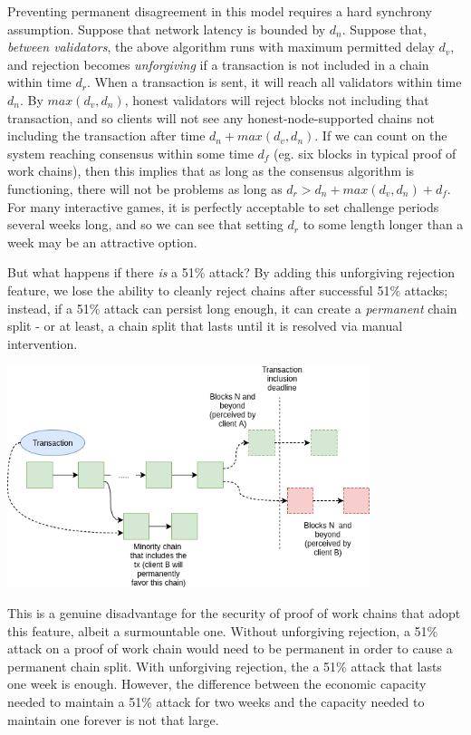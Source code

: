 \documentclass[12pt]{article}
\begin{document}
Preventing permanent disagreement in this model requires a hard synchrony assumption. Suppose that network latency is bounded by $d_n$. Suppose that, \textit{between validators}, the above algorithm runs with maximum permitted delay $d_v$, and rejection becomes \textit{unforgiving} if a transaction is not included in a chain within time $d_r$. When a transaction is sent, it will reach all validators within time $d_n$. By $max(d_v, d_n)$, honest validators will reject blocks not including that transaction, and so clients will not see any honest-node-supported chains not including the transaction after time $d_n + max(d_v, d_n)$. If we can count on the system reaching consensus within some time $d_f$ (eg. six blocks in typical proof of work chains), then this implies that as long as the consensus algorithm is functioning, there will not be problems as long as $d_r > d_n + max(d_v, d_n) + d_f$. For many interactive games, it is perfectly acceptable to set challenge periods several weeks long, and so we can see that setting $d_r$ to some length longer than a week may be an attractive option.

But what happens if there \textit{is} a 51\% attack? By adding this unforgiving rejection feature, we lose the ability to cleanly reject chains after successful 51\% attacks; instead, if a 51\% attack can persist long enough, it can create a \textit{permanent} chain split - or at least, a chain split that lasts until it is resolved via manual intervention.

\includegraphics[width=400px]{Censorship5.png}

This is a genuine disadvantage for the security of proof of work chains that adopt this feature, albeit a surmountable one. Without unforgiving rejection, a 51\% attack on a proof of work chain would need to be permanent in order to cause a permanent chain split. With unforgiving rejection, the a 51\% attack that lasts one week is enough. However, the difference between the economic capacity needed to maintain a 51\% attack for two weeks and the capacity needed to maintain one forever is not that large.
\end{document}
